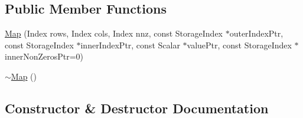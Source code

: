 \subsection*{Public Member Functions}
\begin{DoxyCompactItemize}
\item 
\mbox{\hyperlink{class_eigen_1_1_map_3_01const_01_sparse_matrix_3_01_mat_scalar_00_01_mat_options_00_01_mat_index4032bba20cf92aab8bcf07e926e15a4f_a8075e61ba51d1aa5858b0163e80eca8b}{Map}} (Index rows, Index cols, Index nnz, const Storage\+Index $\ast$outer\+Index\+Ptr, const Storage\+Index $\ast$inner\+Index\+Ptr, const Scalar $\ast$value\+Ptr, const Storage\+Index $\ast$inner\+Non\+Zeros\+Ptr=0)
\item 
\mbox{\hyperlink{class_eigen_1_1_map_3_01const_01_sparse_matrix_3_01_mat_scalar_00_01_mat_options_00_01_mat_index4032bba20cf92aab8bcf07e926e15a4f_aa4b0d0dd528fef0e1f8ce8c043d42b21}{$\sim$\+Map}} ()
\end{DoxyCompactItemize}


\subsection{Constructor \& Destructor Documentation}
\mbox{\label{class_eigen_1_1_map_3_01const_01_sparse_matrix_3_01_mat_scalar_00_01_mat_options_00_01_mat_index4032bba20cf92aab8bcf07e926e15a4f_a8075e61ba51d1aa5858b0163e80eca8b}} 

